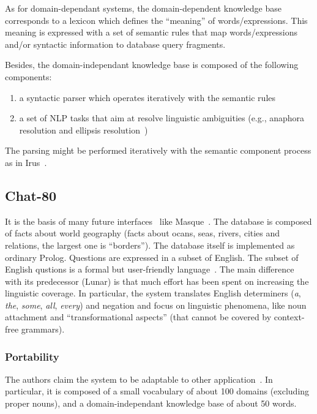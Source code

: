 \documentclass[10pt,journal,letterpaper,compsoc]{IEEEtran}
\begin{document}
As for domain-dependant systems, the domain-dependent knowledge base corresponds
to a lexicon which defines the ``meaning'' of words/expressions. This meaning is
expressed with a set of semantic rules that map words/expressions and/or
syntactic information to database query fragments. 

Besides, the domain-independant knowledge base is composed of the following
components:
\begin{enumerate}
  \item a syntactic parser which operates iteratively with the semantic rules
  \item a set of NLP tasks that aim at resolve linguistic ambiguities (e.g.,
  anaphora resolution and ellipsis
  resolution~\cite{Bates:1983:IRU:511793.511804})
\end{enumerate}
The parsing might be performed iteratively with the semantic component process
as in {\sc Irus}~\cite{Bates:1983:IRU:511793.511804}.





\subsection{{\sc Chat-80}~\cite{Warren:1982:EEA:972942.972944}}
It is the basis of many future
interfaces~\cite{DBLP:journals/corr/cmp-lg-9503016} like {\sc
Masque}~\cite{Androutsopoulos93masque}.
The database is composed of facts about world geography
(facts about ocans, seas, rivers, cities and relations, the largest one is
``borders''). The database itself is implemented as ordinary Prolog.
Questions are expressed in a subset of English. The subset of
English qustions is a formal but user-friendly
language~\cite{Warren:1982:EEA:972942.972944}.
The main difference with its predecessor ({\sc Lunar}) is that much effort has
been spent on increasing the linguistic coverage. 
In particular, the system translates English determiners ({\it a}, {\it the},
{\it some}, {\it all}, {\it every}) and negation and focus on linguistic
phenomena, like noun attachment and ``transformational aspects'' (that cannot
be covered by context-free grammars). 

\subsubsection{Portability}
The authors claim the system to be adaptable to other
application~\cite{Warren:1982:EEA:972942.972944}. In particular, it is
composed of a small vocabulary of about 100 domains (excluding proper nouns),
and a domain-independant knowledge base of about 50 words.
\end{document}
